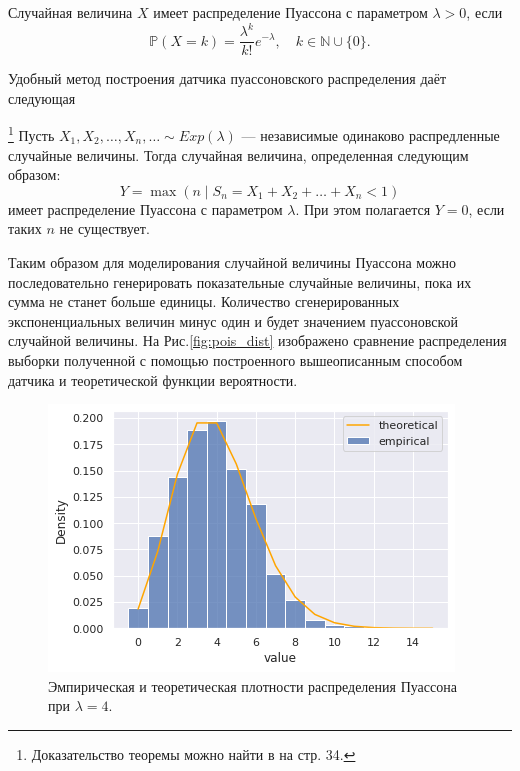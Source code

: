 \begin{definition}
	Случайная величина $X$ имеет распределение Пуассона с параметром $\lambda>0$,
	 если
	$$
	\mathbb{P}(X = k) = \frac{\lambda^k}{k!} e^{-\lambda}, \quad k \in \mathbb{N} 
	\cup \{0\}.
	$$
\end{definition}
Удобный метод построения датчика пуассоновского распределения даёт следующая 
\begin{theorem}\footnote{Доказательство теоремы можно найти в \cite{model_randoms}
	 на стр. 34.}
	Пусть $X_1,X_2,\ldots,X_n,\ldots\sim Exp(\lambda)$ --- независимые одинаково
	 распредленные случайные величины. Тогда случайная величина, определенная
	 следующим образом:
	$$
	Y = \max(n \mid S_n = X_1 + X_2 + \dots + X_n < 1)
	$$
	имеет распределение Пуассона с параметром $\lambda$. При этом полагается $Y=0$,
	 если таких $ n $ не существует.
\end{theorem}
 Таким образом для моделирования случайной величины Пуассона можно последовательно
 генерировать показательные случайные величины, пока их сумма не станет больше
 единицы. Количество сгенерированных экспоненциальных величин минус один и будет
 значением пуассоновской случайной величины. На Рис.\eqref{fig:pois_dist} изображено
 сравнение распределения выборки полученной с помощью построенного вышеописанным
 способом датчика и теоретической функции вероятности.

\begin{figure}[ht]
	\centering
	\includegraphics[width = 0.7\linewidth]{"./resources/pois_dist.png"}
	\caption{Эмпирическая и теоретическая плотности распределения Пуассона при
	 $ \lambda = 4 $.}
    \label{fig:pois_dist}
\end{figure}

